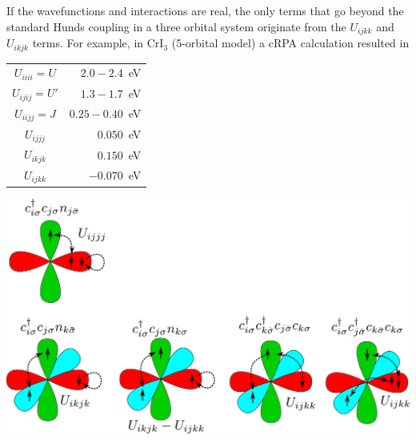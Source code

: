 \documentclass[12pt,a4paper]{scrartcl}
\numberwithin{equation}{section}
\begin{document}
If the wavefunctions and interactions are real, the only terms that go beyond the standard 
Hunds coupling in a three orbital system originate from the $U_{ijkk}$ and $U_{ikjk}$ terms.
For example, in CrI$_3$ (5-orbital model) a cRPA calculation resulted in
\begin{center}
\begin{tabular}{|c|r|}
\hline
 $U_{iiii}=U$ & $ 2.0-2.4$~eV \\
 $U_{ijij}=U'$ & $ 1.3-1.7$~eV \\
 $U_{iijj}=J$ & $ 0.25-0.40$~eV \\ \hline
 $U_{ijjj}$ & $ 0.050$~eV \\
 $U_{ikjk}$ & $ 0.150$~eV \\
 $U_{ijkk}$ & $-0.070$~eV \\ \hline
\end{tabular}
\end{center}

\begin{center}
\includegraphics[width=1\textwidth]{figs/nonHund/orbitals.pdf} 
\end{center}

\end{document}
